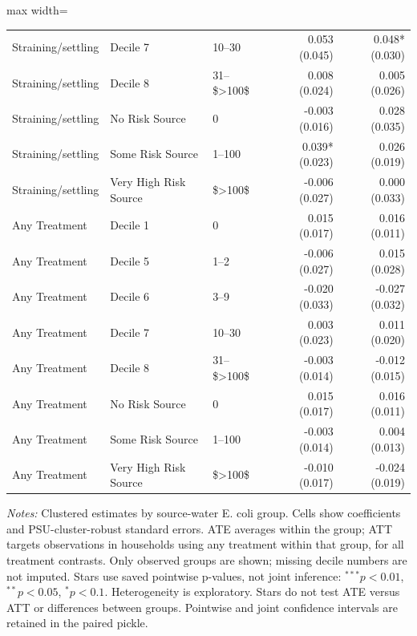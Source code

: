 \begin{table}[htbp]
\begin{adjustbox}{max width=\linewidth}
\begin{tabular}{lllrr}
Straining/settling & Decile 7 & 10--30 & 0.053 (0.045) & 0.048* (0.030) \\
Straining/settling & Decile 8 & 31--\$\textgreater{}100\$ & 0.008 (0.024) & 0.005 (0.026) \\
Straining/settling & No Risk Source & 0 & -0.003 (0.016) & 0.028 (0.035) \\
Straining/settling & Some Risk Source & 1--100 & 0.039* (0.023) & 0.026 (0.019) \\
Straining/settling & Very High Risk Source & \$\textgreater{}100\$ & -0.006 (0.027) & 0.000 (0.033) \\
Any Treatment & Decile 1 & 0 & 0.015 (0.017) & 0.016 (0.011) \\
Any Treatment & Decile 5 & 1--2 & -0.006 (0.027) & 0.015 (0.028) \\
Any Treatment & Decile 6 & 3--9 & -0.020 (0.033) & -0.027 (0.032) \\
Any Treatment & Decile 7 & 10--30 & 0.003 (0.023) & 0.011 (0.020) \\
Any Treatment & Decile 8 & 31--\$\textgreater{}100\$ & -0.003 (0.014) & -0.012 (0.015) \\
Any Treatment & No Risk Source & 0 & 0.015 (0.017) & 0.016 (0.011) \\
Any Treatment & Some Risk Source & 1--100 & -0.003 (0.014) & 0.004 (0.013) \\
Any Treatment & Very High Risk Source & \$\textgreater{}100\$ & -0.010 (0.017) & -0.024 (0.019) \\
\bottomrule
\end{tabular}
\end{adjustbox}
\par\vspace{3pt}\begin{minipage}{\linewidth}\scriptsize\textit{Notes:} Clustered estimates by source-water E. coli group. Cells show coefficients and PSU-cluster-robust standard errors. ATE averages within the group; ATT targets observations in households using any treatment within that group, for all treatment contrasts. Only observed groups are shown; missing decile numbers are not imputed. Stars use saved pointwise p-values, not joint inference: $^{***}p<0.01$, $^{**}p<0.05$, $^{*}p<0.1$. Heterogeneity is exploratory. Stars do not test ATE versus ATT or differences between groups. Pointwise and joint confidence intervals are retained in the paired pickle.\end{minipage}
\end{table}
